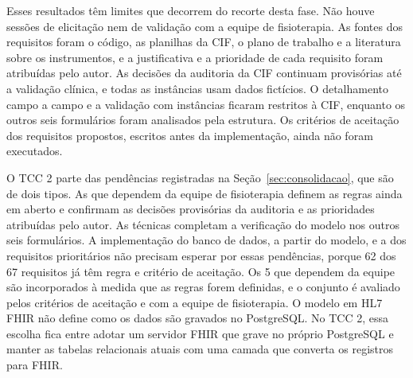 Esses resultados têm limites que decorrem do recorte desta fase. Não houve sessões de elicitação nem de validação com
a equipe de fisioterapia. As fontes dos requisitos foram o código, as planilhas da CIF, o plano de trabalho e a
literatura sobre os instrumentos, e a justificativa e a prioridade de cada requisito foram atribuídas pelo autor. As
decisões da auditoria da CIF continuam provisórias até a validação clínica, e todas as instâncias usam dados
fictícios. O detalhamento campo a campo e a validação com instâncias ficaram restritos à CIF, enquanto os outros seis
formulários foram analisados pela estrutura. Os critérios de aceitação dos requisitos propostos, escritos antes da
implementação, ainda não foram executados.

O TCC 2 parte das pendências registradas na Seção~\ref{sec:consolidacao}, que são de dois tipos. As que dependem da
equipe de fisioterapia definem as regras ainda em aberto e confirmam as decisões provisórias da auditoria e as
prioridades atribuídas pelo autor. As técnicas completam a verificação do modelo nos outros seis formulários.
A implementação do banco de dados, a partir do modelo, e a dos requisitos prioritários não precisam esperar por essas
pendências, porque 62 dos 67 requisitos já têm regra e critério de aceitação. Os 5 que dependem da equipe são
incorporados à medida que as regras forem definidas, e o conjunto é avaliado pelos critérios de aceitação e com a
equipe de fisioterapia. O modelo em HL7 FHIR não define como os dados são gravados no PostgreSQL. No TCC 2, essa
escolha fica entre adotar um servidor FHIR que grave no próprio PostgreSQL e manter as tabelas relacionais atuais com
uma camada que converta os registros para FHIR.
